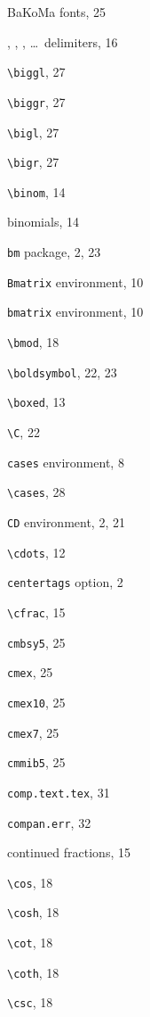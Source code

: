 \documentclass[leqno,titlepage,openany]{amsldoc}[1999/12/13]
\begin{document}
\begin{theindex}
  \indexspace

  \item BaKoMa fonts, 25
  \item {}, , , \dots\ delimiters, 16
  \item \verb*+\biggl+, 27
  \item \verb*+\biggr+, 27
  \item \verb*+\bigl+, 27
  \item \verb*+\bigr+, 27
  \item \verb*+\binom+, 14
  \item binomials, 14
  \item \texttt{bm} package, 2, 23
  \item \texttt{Bmatrix} environment, 10
  \item \texttt{bmatrix} environment, 10
  \item \verb*+\bmod+, 18
  \item \verb*+\boldsymbol+, 22, 23
  \item \verb*+\boxed+, 13

  \indexspace

  \item \verb*+\C+, 22
  \item \texttt{cases} environment, 8
  \item \verb*+\cases+, 28
  \item \texttt{CD} environment, 2, 21
  \item \verb*+\cdots+, 12
  \item \texttt{centertags} option, 2
  \item \verb*+\cfrac+, 15
  \item \texttt{cmbsy5}, 25
  \item \texttt{cmex}, 25
  \item \texttt{cmex10}, 25
  \item \texttt{cmex7}, 25
  \item \texttt{cmmib5}, 25
  \item \texttt{comp.text.tex}, 31
  \item \texttt{compan.err}, 32
  \item continued fractions, 15
  \item \verb*+\cos+, 18
  \item \verb*+\cosh+, 18
  \item \verb*+\cot+, 18
  \item \verb*+\coth+, 18
  \item \verb*+\csc+, 18

  \indexspace


\end{theindex}
\end{document}
